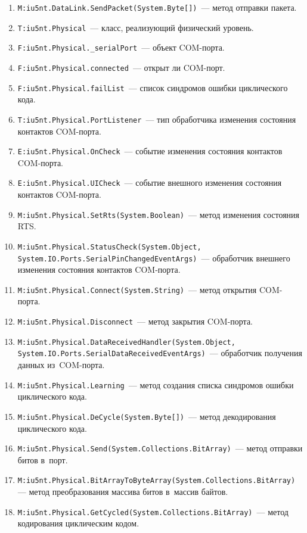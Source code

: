 \documentclass[a4paper,12pt]{article}
\begin{document}
\begin{enumerate}[noitemsep]
\item \texttt{M:iu5nt.DataLink.SendPacket(System.Byte[])}~--- метод отправки пакета.
\item \texttt{T:iu5nt.Physical}~--- класс, реализующий физический уровень.
\item \texttt{F:iu5nt.Physical.\_serialPort}~--- объект COM-порта.
\item \texttt{F:iu5nt.Physical.connected}~--- открыт ли COM-порт.
\item \texttt{F:iu5nt.Physical.failList}~--- список синдромов ошибки циклического кода.
\item \texttt{T:iu5nt.Physical.PortListener}~--- тип обработчика изменения состояния контактов COM-порта.
\item \texttt{E:iu5nt.Physical.OnCheck}~--- событие изменения состояния контактов COM-порта.
\item \texttt{E:iu5nt.Physical.UICheck}~--- событие внешного изменения состояния контактов COM-порта.
\item \texttt{M:iu5nt.Physical.SetRts(System.Boolean)}~--- метод изменения состояния RTS.
\item \texttt{M:iu5nt.Physical.StatusCheck(System.Object,\\System.IO.Ports.SerialPinChangedEventArgs)}~--- обработчик внешнего изменения состояния контактов COM-порта.
\item \texttt{M:iu5nt.Physical.Connect(System.String)}~--- метод открытия COM-порта.
\item \texttt{M:iu5nt.Physical.Disconnect}~--- метод закрытия COM-порта.
\item \texttt{M:iu5nt.Physical.DataReceivedHandler(System.Object,\\System.IO.Ports.SerialDataReceivedEventArgs)}~--- обработчик получения данных из~COM-порта.
\item \texttt{M:iu5nt.Physical.Learning}~--- метод создания списка синдромов ошибки циклического кода.
\item \texttt{M:iu5nt.Physical.DeCycle(System.Byte[])}~--- метод декодирования циклического кода.
\item \texttt{M:iu5nt.Physical.Send(System.Collections.BitArray)}~--- метод отправки битов в~порт.
\item \texttt{M:iu5nt.Physical.BitArrayToByteArray(System.Collections.BitArray)}~--- метод преобразования массива битов в~массив байтов.
\item \texttt{M:iu5nt.Physical.GetCycled(System.Collections.BitArray)}~--- метод кодирования циклическим кодом.

\end{enumerate}
\end{document}
